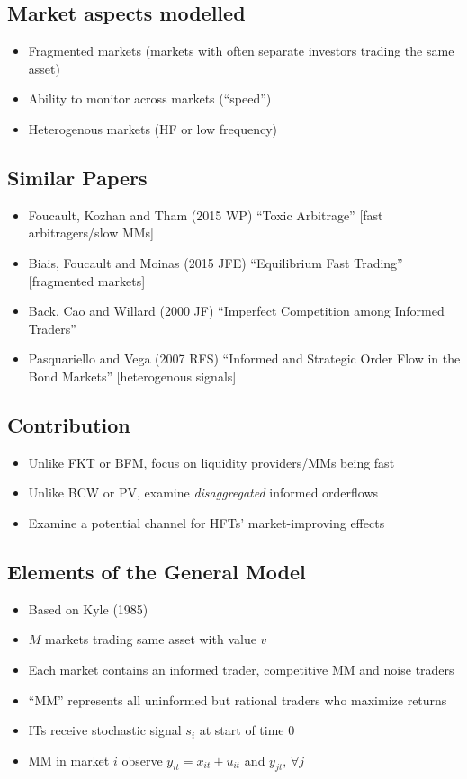 \documentclass{scrartcl}
\begin{document}
			\subsection*{Market aspects modelled}
			\begin{itemize}\itemsep.1em
				\item Fragmented markets (markets with often separate investors trading the same asset)
				\item Ability to monitor across markets (``speed'')
				\item Heterogenous markets (HF or low frequency)
			\end{itemize}

			\subsection*{Similar Papers}
			\begin{itemize}\itemsep.1em
				\item Foucault, Kozhan and Tham (2015 WP) ``Toxic Arbitrage'' [fast arbitragers/slow MMs]
				\item Biais, Foucault and Moinas (2015 JFE) ``Equilibrium Fast Trading'' [fragmented markets]
				\item Back, Cao and Willard (2000 JF) ``Imperfect Competition among Informed Traders''
				\item Pasquariello and Vega (2007 RFS) ``Informed and Strategic Order Flow in the Bond Markets'' [heterogenous signals]
			\end{itemize}

			\subsection*{Contribution}
			\begin{itemize}\itemsep.1em
				\item Unlike FKT or BFM, focus on liquidity providers/MMs being fast
				\item Unlike BCW or PV, examine \emph{disaggregated} informed orderflows
				\item Examine a potential channel for HFTs' market-improving effects
			\end{itemize}

			\subsection*{Elements of the General Model}
			\begin{itemize}\itemsep.1em
				\item Based on Kyle (1985)
				\item $M$ markets trading same asset with value $v$
				\item Each market contains an informed trader, competitive MM and noise traders
				\item ``MM'' represents all uninformed but rational traders who maximize returns
				\item ITs receive stochastic signal $s_i$ at start of time 0
				\item MM in market $i$ observe $y_{it} = x_{it} + u_{it} $ and $y_{jt}, \, \forall j$ 
			\end{itemize}
\end{document}
